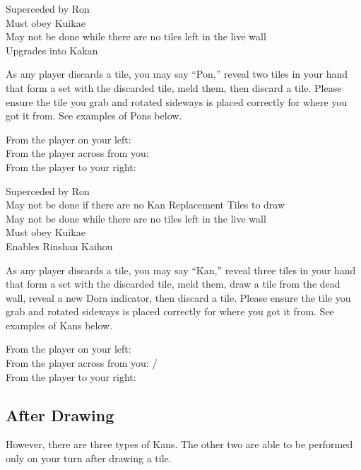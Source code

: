 	{\symbnegate Superceded by Ron \\
	\upgradesto Must obey Kuikae~\\
	\symbnegate May not be done while there are no tiles left in the live wall\\
	\upgradesto Upgrades into Kakan }
	{As any player discards a tile, you may say ``Pon,'' reveal two tiles in your hand that form a set with the discarded tile, meld them, then discard a tile. Please ensure the tile you grab and rotated sideways is placed correctly for where you got it from. See examples of Pons below.
	\begin{center}{From the player on your left: \\ From the player across from you: \\ From the player to your right: }\end{center}}

	{\symbnegate Superceded by Ron \\
	\symbnegate May not be done if there are no Kan Replacement Tiles to draw \\
	\symbnegate May not be done while there are no tiles left in the live wall\\
	\upgradesto Must obey Kuikae~\\
	\upgradestoother Enables Rinshan Kaihou }
	{As any player discards a tile, you may say ``Kan,'' reveal three tiles in your hand that form a set with the discarded tile, meld them, draw a tile from the dead wall, reveal a new Dora indicator, then discard a tile. Please ensure the tile you grab and rotated sideways is placed correctly for where you got it from. See examples of Kans below.
	\begin{center}{From the player on your left: \\ From the player across from you: /\\ From the player to your right: }\end{center}}

\subsection{After Drawing}\label{core:ssec:drawn}

However, there are three types of Kans. The other two are able to be performed only on your turn after drawing a tile.

